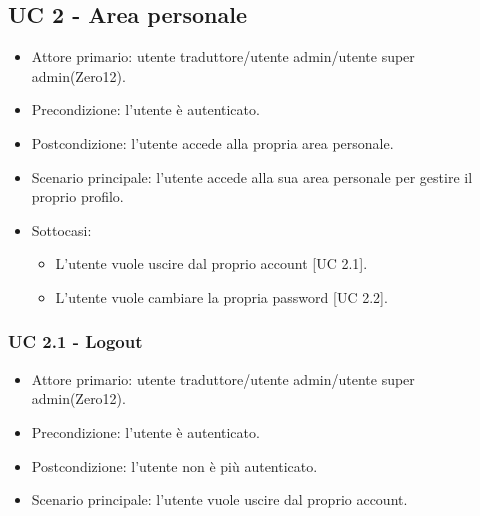 \subsection{UC 2 - Area personale}
    \begin{itemize}
        \item Attore primario: utente traduttore/utente admin/utente super admin(Zero12).
        \item Precondizione: l'utente è autenticato.
        \item Postcondizione: l'utente accede alla propria area personale.
        \item Scenario principale: l'utente accede alla sua area personale per gestire il proprio profilo.
        \item Sottocasi:
            \begin{itemize}
                \item L'utente vuole uscire dal proprio account [UC 2.1].
                \item L'utente vuole cambiare la propria password [UC 2.2].
            \end{itemize}
    \end{itemize}
    \subsubsection{UC 2.1 - Logout}
        \begin{itemize}
            \item Attore primario: utente traduttore/utente admin/utente super admin(Zero12).
            \item Precondizione: l'utente è autenticato.
            \item Postcondizione: l'utente non è più autenticato.
            \item Scenario principale: l'utente vuole uscire dal proprio account.
        \end{itemize}
